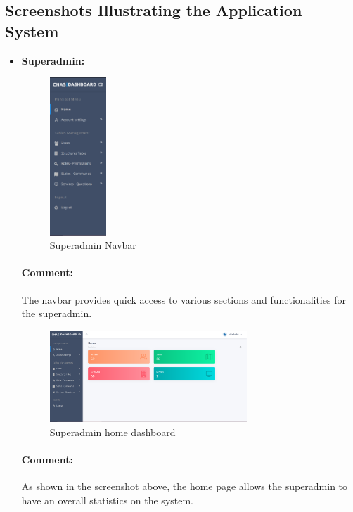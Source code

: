 \subsection{Screenshots Illustrating the Application System}

\bigskip
\begin{itemize}
    \item \textbf{Superadmin:}
\begin{figure}[htbp]
  \centering
  \includegraphics[width=0.2\textwidth]{SCREENSHOTS/superadmin/navbar.png}
  \caption{Superadmin Navbar}
  \label{fig:navbar}
\end{figure}
\paragraph{Comment:} The navbar provides quick access to various sections and functionalities for the superadmin.
\newpage

\begin{figure}[htbp]
    \centering
    \includegraphics[width=0.7\textwidth]{SCREENSHOTS/superadmin/home.png}
    \caption{Superadmin home dashboard}
    \label{fig:home}
  \end{figure}
  \paragraph{Comment:} As shown in the screenshot above, the home page allows the superadmin to have an overall statistics on the system.



\end{itemize}
